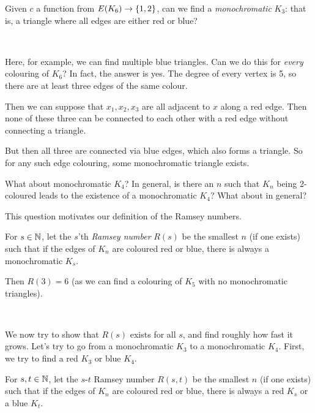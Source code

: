 \documentclass{article}
\begin{document}
\begin{example}
    Given $c$ a function from $E(K_6) \to \left\lbrace 1, 2 \right\rbrace$, can we find a \textit{monochromatic} $K_3$: that is, a triangle where all edges are either red or blue?
    
    \  \
    
    Here, for example, we can find multiple blue triangles. Can we do this for \textit{every} colouring of $K_6$? In fact, the answer is yes. The degree of every vertex is 5, so there are at least three edges of the same colour.
    
    Then we can suppose that $x_1, x_2, x_3$ are all adjacent to $x$ along a red edge. Then none of these three can be connected to each other with a red edge without connecting a triangle.
    
    But then all three are connected via blue edges, which also forms a triangle. So for any such edge colouring, some monochromatic triangle exists.
\end{example}

What about monochromatic $K_4$? In general, is there an $n$ such that $K_n$ being 2-coloured leads to the existence of a monochromatic $K_4$? What about in general?

This question motivates our definition of the Ramsey numbers.

\begin{definition}
    For $s \in \mathbb{N}$, let the $s$'th \textit{Ramsey number} $R(s)$ be the smallest $n$ (if one exists) such that if the edges of $K_n$ are coloured red or blue, there is always a monochromatic $K_s$.
\end{definition}

Then $R(3) = 6$ (as we can find a colouring of $K_5$ with no monochromatic triangles).

\  \

We now try to show that $R(s)$ exists for all $s$, and find roughly how fast it grows. Let's try to go from a monochromatic $K_3$ to a monochromatic $K_4$. First, we try to find a red $K_3$ or blue $K_4$.

\begin{definition}
    For $s, t \in \mathbb{N}$, let the $s$-$t$ Ramsey number $R(s, t)$ be the smallest $n$ (if one exists) such that if the edges of $K_n$ are coloured red or blue, there is always a red $K_s$ or a blue $K_t$.
\end{definition}
\end{document}

